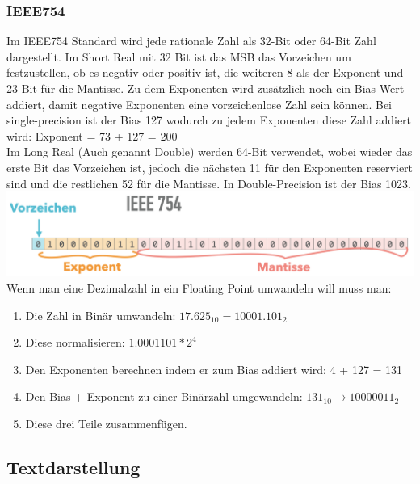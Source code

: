 \documentclass{article}
\begin{document}
		\subsubsection{IEEE754}
		Im IEEE754 Standard wird jede rationale Zahl als 32-Bit oder 64-Bit Zahl dargestellt. Im Short Real mit 32 Bit ist das MSB das Vorzeichen um festzustellen, ob es negativ oder positiv ist, die weiteren 8 als der Exponent und 23 Bit für die Mantisse. Zu dem Exponenten wird zusätzlich noch ein Bias Wert addiert, damit negative Exponenten eine vorzeichenlose Zahl sein können. Bei single-precision ist der Bias 127 wodurch zu jedem Exponenten diese Zahl addiert wird: Exponent = 73 + 127 = 200\\
		Im Long Real (Auch genannt Double) werden 64-Bit verwendet, wobei wieder das erste Bit das Vorzeichen ist, jedoch die nächsten 11 für den Exponenten reserviert sind und die restlichen 52 für die Mantisse. In Double-Precision ist der Bias 1023. \\
		\includegraphics[scale=0.25]{Bilder/IEEE754.png} \\
		Wenn man eine Dezimalzahl in ein Floating Point umwandeln will muss man: 
		\begin{enumerate}
			\item{Die Zahl in Binär umwandeln: $17.625_{10} = 10001.101_2$}
			\item{Diese normalisieren: $1.0001101 * 2^4$}
			\item{Den Exponenten berechnen indem er zum Bias addiert wird: 4 + 127 = 131}
			\item{Den Bias + Exponent zu einer Binärzahl umgewandeln: $131_{10} \to 10000011_2$}
			\item{Diese drei Teile zusammenfügen.}
		\end{enumerate}
		\subsection{Textdarstellung}
\end{document}
